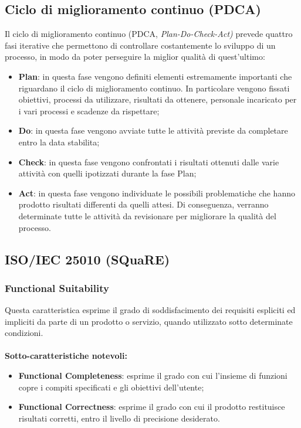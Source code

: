 \subsection{Ciclo di miglioramento continuo (PDCA)}
Il ciclo di miglioramento continuo (PDCA, \emph{Plan-Do-Check-Act)} prevede quattro fasi iterative che permettono di controllare costantemente lo sviluppo di un processo, in modo da poter perseguire la miglior qualità di quest'ultimo:
\begin{itemize}
	\item \textbf{Plan}: in questa fase vengono definiti elementi estremamente importanti che riguardano il ciclo di miglioramento continuo. In particolare vengono fissati obiettivi, processi da utilizzare, risultati da ottenere, personale incaricato per i vari processi e scadenze da rispettare;
	\item \textbf{Do}: in questa fase vengono avviate tutte le attività previste da completare entro la data stabilita;
	\item \textbf{Check}: in questa fase vengono confrontati i risultati ottenuti dalle varie attività con quelli ipotizzati durante la fase Plan;
	\item \textbf{Act}: in questa fase vengono individuate le possibili problematiche che hanno prodotto risultati differenti da quelli attesi. Di conseguenza, verranno determinate tutte le attività da revisionare per migliorare la qualità del processo. 
\end{itemize}

\subsection{ISO/IEC 25010 (SQuaRE)}
\subsubsection{Functional Suitability}
Questa caratteristica esprime il grado di soddisfacimento dei requisiti espliciti ed impliciti da parte di un prodotto o servizio, quando utilizzato sotto determinate condizioni.\\ \\
\textbf{Sotto-caratteristiche notevoli:}
\begin{itemize}
	\item{\textbf{Functional Completeness}}: esprime il grado con cui l'insieme di funzioni copre i compiti specificati e gli obiettivi dell'utente;
	\item{\textbf{Functional Correctness}}: esprime il grado con cui il prodotto restituisce risultati corretti, entro il livello di precisione desiderato.
\end{itemize}

